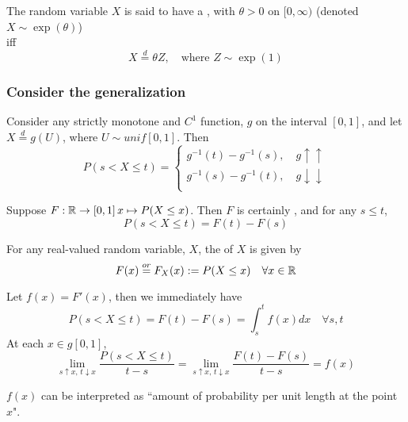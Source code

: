 \documentclass[11pt]{article}
\numberwithin{equation}{section}
\begin{document}
 The random variable $X$ is said to have a , with  $\theta > 0$ on $[0, \infty)$ (denoted $X \sim \exp(\theta)$)\\
iff \\
\begin{equation}
	X \overset{d}{=} \theta Z, \quad \text{where } Z \sim \exp(1)
\end{equation}

\subsubsection{Consider the generalization}
Consider any strictly monotone and $C^1$ function, $g$ on the interval $[0, 1]$, and let $X \overset{d}{=} g(U)$, where $U \sim unif[0, 1]$. Then
\begin{equation}
	P(s < X \leq t) = \begin{cases}
		g^{-1}(t) - g^{-1}(s), \quad g \uparrow\uparrow\\
		g^{-1}(s) - g^{-1}(t), \quad g \downarrow\downarrow\\
	\end{cases}
\end{equation}

\corollary Suppose $F: \mathbb{R} \rightarrow [0, 1] \, x \mapsto P(X \leq x)$. Then $F$ is certainly , and for any $s \leq t$, 
\begin{equation}
	P(s < X \leq t) = F(t) - F(s)
\end{equation}

 For any real-valued random variable, $X$, the  of $X$ is given by
\begin{equation}
	F(x) \overset{or}{=} F_X(x) := P(X \leq x) \quad \forall x \in \mathbb{R}
\end{equation}

\remark
Let $f(x) = F'(x)$, then we immediately have
\begin{equation}
	P(s < X \leq t) = F(t) - F(s) = \int_s^t f(x) dx \quad \forall s, t
\end{equation}
At each $x \in g[0, 1]$,
\begin{equation}
	\lim_{s \uparrow x, \, t \downarrow x} \frac{P(s < X \leq t)}{t - s} = \lim_{s \uparrow x, \, t \downarrow x} \frac{F(t) - F(s)}{t - s} = f(x)
\end{equation}

\remark
$f(x)$ can be interpreted as ``amount of probability per unit length at the point $x$".
\end{document}
